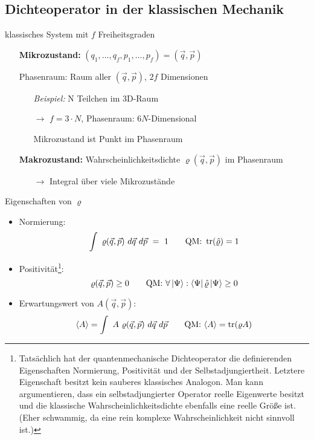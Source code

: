 \subsection{\glqq Dichteoperator\grqq{} in der klassischen Mechanik}     
klassisches System mit $f$ Freiheitsgraden

\begin{itemize}
    \item[] \textbf{Mikrozustand:} $(q_1,\dots,q_f,p_1,\dots,p_f)=(\Vec{q}, \Vec{p})$
    \item[] Phasenraum: Raum aller $(\Vec{q}, \Vec{p})$, $2f$ Dimensionen
    \begin{itemize}
        \item[] \emph{Beispiel:} N Teilchen im 3D-Raum
        \item[$\rightarrow$] $f = 3 \cdot N$, Phasenraum: $6N$-Dimensional
        \item[] Mikrozustand ist Punkt im Phasenraum 
    \end{itemize}
    \item[] \textbf{Makrozustand:} Wahrscheinlichkeitsdichte $\varrho(\Vec{q}, \Vec{p})$ im Phasenraum
    \begin{itemize}
        \item[$\rightarrow$] \glqq Integral über viele Mikrozustände\grqq
    \end{itemize}
\end{itemize}

\begin{prop}{Eigenschaften von $\varrho$}
    \begin{itemize}
        \item Normierung:
        \begin{equation}
            \int \ \varrho(\Vec{q}, \Vec{p}) \ d\Vec{q} \ d\Vec{p} \ = \ 1 \qquad \text{QM: } \trace(\hat{\varrho}) = 1
        \end{equation}
        \item Positivität\footnote{Tatsächlich hat der quantenmechanische Dichteoperator die definierenden Eigenschaften Normierung, Positivität und der Selbstadjungiertheit. Letztere Eigenschaft besitzt kein sauberes klassisches Analogon. Man kann argumentieren, dass ein selbstadjungierter Operator reelle Eigenwerte besitzt und die klassische Wahrscheinlichkeitsdichte ebenfalls eine reelle Größe ist. (Eher schwammig, da eine rein komplexe Wahrscheinlichkeit nicht sinnvoll ist.)}:
        \begin{equation}
            \varrho(\Vec{q}, \Vec{p}) \geq 0 \qquad \text{QM: } \forall \ket{\Psi}: \bra{\Psi} \hat{\varrho} \ket{\Psi} \geq 0
        \end{equation}
        \item Erwartungswert von $A(\Vec{q}, \Vec{p})$:
        \begin{equation}
            \langle A \rangle = \int \ A \ \varrho(\Vec{q}, \Vec{p}) \ d\Vec{q} \ d\Vec{p} \qquad \text{QM: } \langle A \rangle = \trace(\varrho A) 
        \end{equation}
    \end{itemize}
\end{prop}

